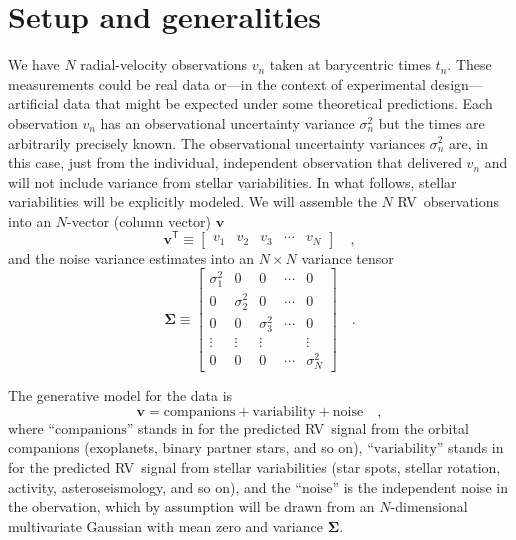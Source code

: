\documentclass[modern]{aastex63}
\newcommand{\acronym}[1]{{\small{#1}}}
\newcommand{\rv}{\acronym{RV}}
\newcommand{\T}{^{\!\mathsf{T}\!}}
\renewcommand{\vector}[1]{\boldsymbol{#1}}
\renewcommand{\tensor}[1]{\mathbf{#1}}
\newcommand{\vv}{\vector{v}}
\newcommand{\tSigma}{\tensor{\Sigma}}
\begin{document}
\section{Setup and generalities}

We have $N$ radial-velocity observations $v_n$ taken at barycentric times
$t_n$.
These measurements could be real data or---in the context of experimental
design---artificial data that might be expected under some theoretical
predictions.
Each observation $v_n$ has an observational uncertainty variance
$\sigma^2_n$ but the times are arbitrarily precisely known.
The observational uncertainty variances $\sigma^2_n$ are, in this case,
just from the individual, independent observation that delivered $v_n$
and will not include variance from stellar variabilities.
In what follows, stellar variabilities will be explicitly modeled.
We will assemble the $N$ \rv\ observations into an $N$-vector (column vector) $\vv$
\begin{equation}
  \vv\T \equiv \begin{bmatrix} v_1 & v_2 & v_3 & \cdots & v_N \end{bmatrix}
  \quad ,
\end{equation}
and the noise variance estimates into an $N\times N$ variance tensor
\begin{equation}
  \tSigma \equiv \begin{bmatrix} \sigma_1^2 & 0 & 0 & \cdots & 0 \\
                                 0 & \sigma_2^2 & 0 & \cdots & 0 \\
                                 0 & 0 & \sigma_3^2 & \cdots & 0 \\
                                 \vdots & \vdots & \vdots & & \vdots \\
                                 0 & 0 & 0 & \cdots & \sigma_N^2 \end{bmatrix}
  \quad .
\end{equation}

The generative model for the data is
\begin{equation}
  \vv = \mbox{companions} + \mbox{variability} + \mbox{noise}
  \quad ,
\end{equation}
where ``$\mbox{companions}$'' stands in for the predicted \rv\ signal
from the orbital companions (exoplanets, binary partner stars, and so
on),
``$\mbox{variability}$'' stands in for the predicted \rv\ signal from
stellar variabilities (star spots, stellar rotation, activity,
asteroseismology, and so on),
and
the ``$\mbox{noise}$'' is the independent noise in the obervation,
which by assumption will be drawn from an $N$-dimensional
multivariate Gaussian with mean zero and variance $\tSigma$.
\end{document}
